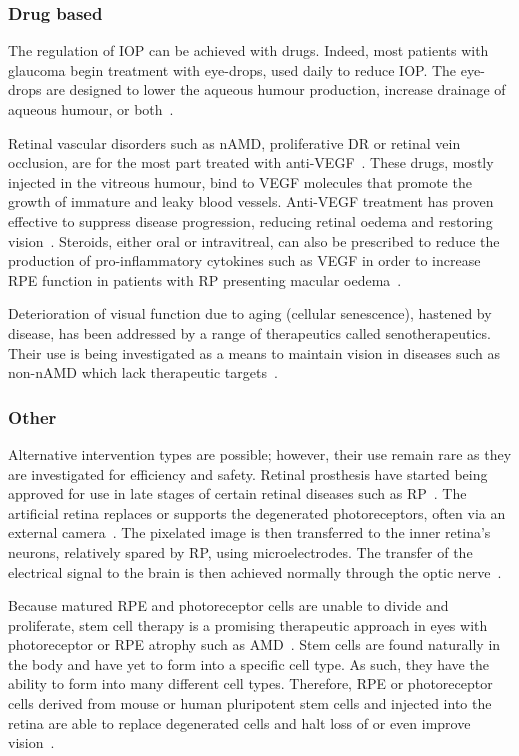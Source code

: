 \documentclass{article}
\begin{document}
\subsubsection{Drug based}

The regulation of IOP can be achieved with drugs.
Indeed, most patients with glaucoma begin treatment with eye-drops, used daily to reduce IOP.
The eye-drops are designed to lower the aqueous humour production, increase drainage of aqueous humour, or both~\cite{Chakrabarti_2022,Quigley_2011}.

Retinal vascular disorders such as nAMD, proliferative DR or retinal vein occlusion, are for the most part treated with anti-VEGF~\cite{Andreoli_2007,Kim_2021}.
These drugs, mostly injected in the vitreous humour, bind to VEGF molecules that promote the growth of immature and leaky blood vessels.
Anti-VEGF treatment has proven effective to suppress disease progression, reducing retinal oedema and restoring vision~\cite{Andreoli_2007,Heier_2006,Kim_2021}.
Steroids, either oral or intravitreal, can also be prescribed to reduce the production of pro-inflammatory cytokines such as VEGF in order to increase RPE function in patients with RP presenting macular oedema~\cite{Strong_2016}.

Deterioration of visual function due to aging (cellular senescence), hastened by disease, has been addressed by a range of therapeutics called senotherapeutics.
Their use is being investigated as a means to maintain vision in diseases such as non-nAMD which lack therapeutic targets~\cite{Lee_2021}.


\subsubsection{Other}

Alternative intervention types are possible; however, their use remain rare as they are investigated for efficiency and safety.
Retinal prosthesis have started being approved for use in late stages of certain retinal diseases such as RP~\cite{Luo_2016}.
The artificial retina replaces or supports the degenerated photoreceptors, often via an external camera~\cite{Luo_2016,Stingl_2017}.
The pixelated image is then transferred to the inner retina's neurons, relatively spared by RP, using microelectrodes.
The transfer of the electrical signal to the brain is then achieved normally through the optic nerve~\cite{Luo_2016,Stingl_2017}.

Because matured RPE and photoreceptor cells are unable to divide and proliferate, stem cell therapy is a promising therapeutic approach in eyes with photoreceptor or RPE atrophy such as AMD~\cite{Berta_2011,Stern_2015}.
Stem cells are found naturally in the body and have yet to form into a specific cell type.
As such, they have the ability to form into many different cell types.
Therefore, RPE or photoreceptor cells derived from mouse or human pluripotent stem cells and injected into the retina are able to replace degenerated cells and halt loss of or even improve vision~\cite{ONeill_2020, Ribeiro_2021}.
\end{document}
